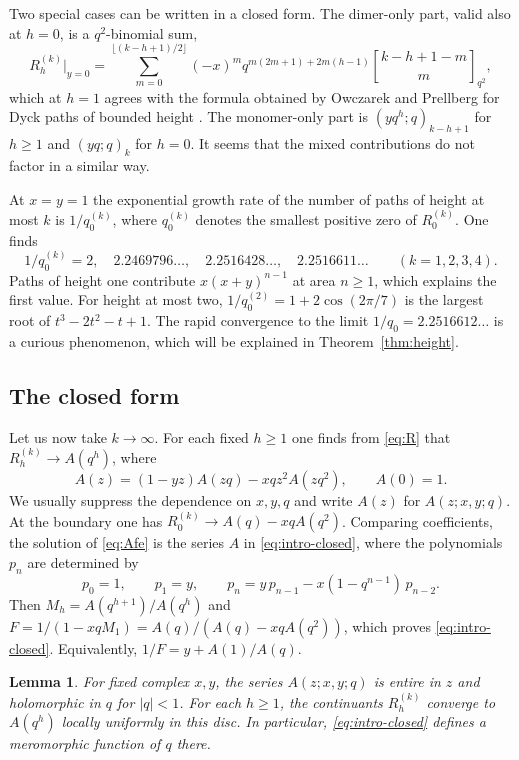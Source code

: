 \documentclass[11pt,reqno]{amsart}
\numberwithin{equation}{section}
\newtheorem{lemma}[theorem]{Lemma}
\theoremstyle{remark}
\begin{document}
Two special cases can be written in a closed form. The dimer-only part, valid also at
$h=0$, is a $q^2$-binomial sum,
\[
R^{(k)}_h\big|_{y=0}=\sum_{m=0}^{\lfloor(k-h+1)/2\rfloor}(-x)^mq^{m(2m+1)+2m(h-1)}\genfrac{[}{]}{0pt}{}{k-h+1-m}{m}_{q^2},
\]
which at $h=1$ agrees with the formula obtained by Owczarek and Prellberg for Dyck paths
of bounded height \cite{OP12}. The monomer-only part is $(yq^h;q)_{k-h+1}$ for $h\ge1$ and
$(yq;q)_k$ for $h=0$. It seems that the mixed contributions do not factor in a similar
way.

At $x=y=1$ the exponential growth rate of the number of paths of height at most $k$ is
$1/q^{(k)}_0$, where $q^{(k)}_0$ denotes the smallest positive zero of $R^{(k)}_0$. One
finds
\[
1/q^{(k)}_0=2,\quad 2.2469796\ldots,\quad 2.2516428\ldots,\quad 2.2516611\ldots\qquad(k=1,2,3,4).
\]
Paths of height one contribute $x(x+y)^{n-1}$ at area $n\ge1$, which explains the first
value. For height at most two, $1/q^{(2)}_0=1+2\cos(2\pi/7)$ is the largest root of
$t^3-2t^2-t+1$. The rapid convergence to the limit $1/q_0=2.2516612\ldots$ is a curious
phenomenon, which will be explained in Theorem~\ref{thm:height}.

\subsection{The closed form}
Let us now take $k\to\infty$. For each fixed $h\ge1$ one finds from \eqref{eq:R} that
$R^{(k)}_h\to A(q^h)$, where
\begin{equation}\label{eq:Afe}
A(z)=(1-yz)A(zq)-xqz^2A(zq^2),\qquad A(0)=1 .
\end{equation}
We usually suppress the dependence on $x,y,q$ and write $A(z)$ for $A(z;x,y;q)$. At the
boundary one has $R^{(k)}_0\to A(q)-xqA(q^2)$. Comparing coefficients, the solution of
\eqref{eq:Afe} is the series $A$ in \eqref{eq:intro-closed}, where the polynomials $p_n$
are determined by
\begin{equation}\label{eq:pn}
p_0=1,\qquad p_1=y,\qquad p_n=y\,p_{n-1}-x(1-q^{n-1})\,p_{n-2}.
\end{equation}
Then $M_h=A(q^{h+1})/A(q^h)$ and $F=1/(1-xqM_1)=A(q)/(A(q)-xqA(q^2))$, which proves
\eqref{eq:intro-closed}. Equivalently, $1/F=y+A(1)/A(q)$.

\begin{lemma}\label{lem:analytic}
For fixed complex $x,y$, the series $A(z;x,y;q)$ is entire in $z$ and holomorphic in
$q$ for $|q|<1$. For each $h\ge1$, the continuants $R^{(k)}_h$ converge to $A(q^h)$
locally uniformly in this disc. In particular, \eqref{eq:intro-closed} defines a
meromorphic function of $q$ there.
\end{lemma}
\end{document}
